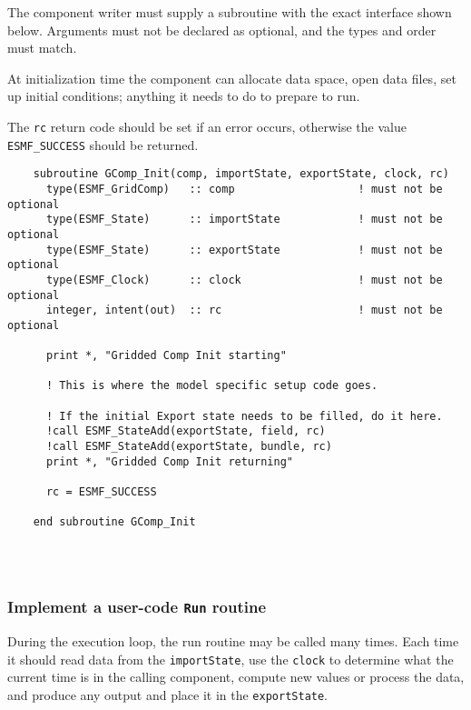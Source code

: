    The component writer must supply a subroutine with the exact interface 
   shown below. Arguments must not be declared as optional, and the types and
   order must match.
  
   At initialization time the component can allocate data space, open
   data files, set up initial conditions; anything it needs to do to
   prepare to run.
  
   The {\tt rc} return code should be set if an error occurs, otherwise
   the value {\tt ESMF\_SUCCESS} should be returned. 

 \begin{verbatim}
    subroutine GComp_Init(comp, importState, exportState, clock, rc)
      type(ESMF_GridComp)   :: comp                   ! must not be optional
      type(ESMF_State)      :: importState            ! must not be optional
      type(ESMF_State)      :: exportState            ! must not be optional
      type(ESMF_Clock)      :: clock                  ! must not be optional
      integer, intent(out)  :: rc                     ! must not be optional

      print *, "Gridded Comp Init starting"

      ! This is where the model specific setup code goes.  
 
      ! If the initial Export state needs to be filled, do it here.
      !call ESMF_StateAdd(exportState, field, rc)
      !call ESMF_StateAdd(exportState, bundle, rc)
      print *, "Gridded Comp Init returning"
   
      rc = ESMF_SUCCESS

    end subroutine GComp_Init
 
\end{verbatim}
 
 
\mbox{}\hrulefill\ 
 

  \subsubsection{Implement a user-code {\tt Run} routine}
   
   \label{sec:GridRun}
  
   During the execution loop, the run routine may be called many times.
   Each time it should read data from the {\tt importState}, use the
   {\tt clock} to determine what the current time is in the calling
   component, compute new values or process the data,
   and produce any output and place it in the {\tt exportState}. 
   
